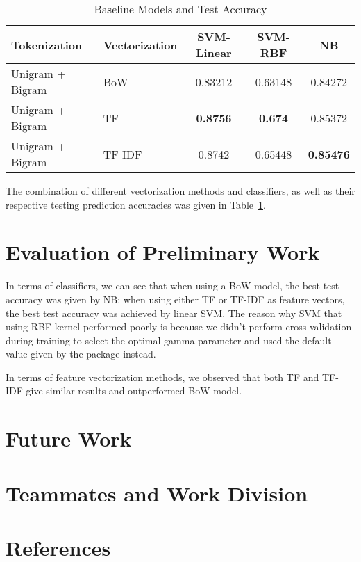\documentclass{article}
\begin{document}
\begin{table}[h]
  \caption{Baseline Models and Test Accuracy}\label{tab:a}
  \centering
  \begin{tabular}{ l l|| c | c | c} 
     \toprule
    Tokenization  & Vectorization & SVM-Linear & SVM-RBF & NB \\

    \midrule
    Unigram + Bigram & BoW  & 0.83212      & 0.63148    & 0.84272    \\
    Unigram + Bigram & TF & \textbf{0.8756}       & \textbf{0.674}     & 0.85372      \\
    Unigram + Bigram  & TF-IDF  & 0.8742      & 0.65448     & \textbf{0.85476}  \\
    \bottomrule
  \end{tabular}
\end{table}

The combination of different vectorization methods and classifiers, as well as their respective testing prediction accuracies was given in Table~\ref{tab:a}.


\section{Evaluation of Preliminary Work}

In terms of classifiers, we can see that when using a BoW model, the best test accuracy was given by NB; when using either TF or TF-IDF as feature vectors, the best test accuracy was achieved by linear SVM. The reason why SVM that using RBF kernel performed poorly is because we didn't perform cross-validation during training to select the optimal gamma parameter and used the default value given by the package instead.

In terms of feature vectorization methods, we observed that both TF and TF-IDF give similar results and outperformed BoW model.


\section{Future Work}

\section{Teammates and Work Division}

\section*{References}
\end{document}
